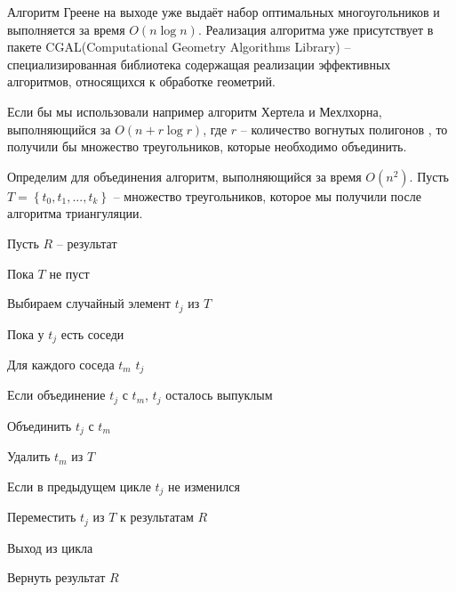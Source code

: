Алгоритм Греене на выходе уже выдаёт набор оптимальных многоугольников и выполняется за время $O(n \log n)$\cite{Greene}. Реализация алгоритма уже присутствует в пакете CGAL(Computational Geometry Algorithms Library) -- специализированная библиотека содержащая реализации эффективных алгоритмов, относящихся к обработке геометрий.

Если бы мы использовали например алгоритм Хертела и Мехлхорна, выполняющийся за $O(n + r \log r)$, где $r$ -- количество вогнутых полигонов \cite{Melhorn}, то получили бы множество треугольников, которые необходимо объединить. 

Определим для объединения алгоритм, выполняющийся за время $O(n^2)$. Пусть $T=\left\lbrace t_0, t_1, ..., t_k \right\rbrace $ -- множество треугольников, которое мы получили после алгоритма триангуляции.

Пусть $R$ -- результат

Пока $T$ не пуст

\quad Выбираем случайный элемент $t_j$ из $T$

\quad Пока у $t_j$ есть соседи

\quad\quad Для каждого соседа $t_m$ $t_j$

\quad\quad\quad Если объединение $t_j$ с $t_m$, $t_j$ осталось выпуклым

\quad\quad\quad\quad Объединить $t_j$ с $t_m$

\quad\quad\quad\quad Удалить $t_m$ из $T$

\quad\quad Если в предыдущем цикле $t_j$ не изменился

\quad\quad\quad Переместить $t_j$ из $T$ к результатам $R$

\quad\quad\quad Выход из цикла

Вернуть результат $R$

